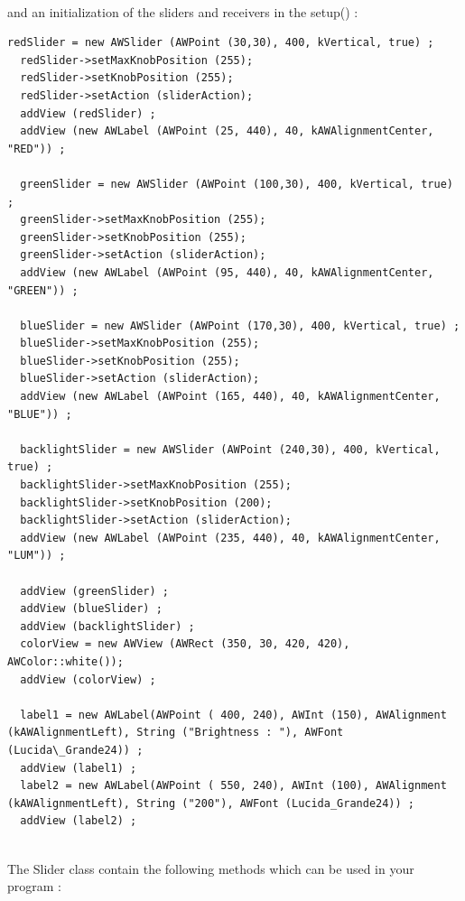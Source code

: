 \documentclass[a4paper,11pt]{extarticle}
\begin{document}
~\\ and an initialization of the sliders and receivers in the setup() :

\begin{lstlisting}[language=Arduinonl]
 redSlider = new AWSlider (AWPoint (30,30), 400, kVertical, true) ;
  redSlider->setMaxKnobPosition (255);
  redSlider->setKnobPosition (255);
  redSlider->setAction (sliderAction);
  addView (redSlider) ;
  addView (new AWLabel (AWPoint (25, 440), 40, kAWAlignmentCenter, "RED")) ;
  
  greenSlider = new AWSlider (AWPoint (100,30), 400, kVertical, true) ;
  greenSlider->setMaxKnobPosition (255);
  greenSlider->setKnobPosition (255);
  greenSlider->setAction (sliderAction);
  addView (new AWLabel (AWPoint (95, 440), 40, kAWAlignmentCenter, "GREEN")) ;

  blueSlider = new AWSlider (AWPoint (170,30), 400, kVertical, true) ;
  blueSlider->setMaxKnobPosition (255);
  blueSlider->setKnobPosition (255);
  blueSlider->setAction (sliderAction);
  addView (new AWLabel (AWPoint (165, 440), 40, kAWAlignmentCenter, "BLUE")) ;

  backlightSlider = new AWSlider (AWPoint (240,30), 400, kVertical, true) ;
  backlightSlider->setMaxKnobPosition (255);
  backlightSlider->setKnobPosition (200);
  backlightSlider->setAction (sliderAction);
  addView (new AWLabel (AWPoint (235, 440), 40, kAWAlignmentCenter, "LUM")) ;

  addView (greenSlider) ;
  addView (blueSlider) ;
  addView (backlightSlider) ;
  colorView = new AWView (AWRect (350, 30, 420, 420), AWColor::white());
  addView (colorView) ;

  label1 = new AWLabel(AWPoint ( 400, 240), AWInt (150), AWAlignment (kAWAlignmentLeft), String ("Brightness : "), AWFont (Lucida\_Grande24)) ;
  addView (label1) ;
  label2 = new AWLabel(AWPoint ( 550, 240), AWInt (100), AWAlignment (kAWAlignmentLeft), String ("200"), AWFont (Lucida_Grande24)) ;
  addView (label2) ;
\end{lstlisting}


~\\ The Slider class contain the following methods which can be used in your program :
\end{document}
